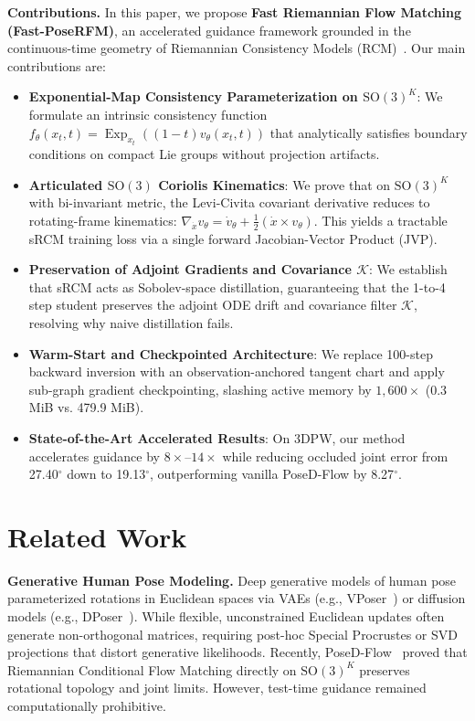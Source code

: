 \documentclass[10pt,twocolumn,letterpaper]{article}
\DeclareMathOperator{\Exp}{Exp}
\begin{document}
\textbf{Contributions.} In this paper, we propose \textbf{Fast Riemannian Flow Matching (Fast-PoseRFM)}, an accelerated guidance framework grounded in the continuous-time geometry of Riemannian Consistency Models (RCM)~\cite{zhou2025rcm}. Our main contributions are:
\begin{itemize}
    \item \textbf{Exponential-Map Consistency Parameterization on $\mathrm{SO}(3)^K$}: We formulate an intrinsic consistency function $f_\theta(x_t, t) = \Exp_{x_t}((1-t)v_\theta(x_t, t))$ that analytically satisfies boundary conditions on compact Lie groups without projection artifacts.
    \item \textbf{Articulated $\mathrm{SO}(3)$ Coriolis Kinematics}: We prove that on $\mathrm{SO}(3)^K$ with bi-invariant metric, the Levi-Civita covariant derivative reduces to rotating-frame kinematics: $\nabla_{\dot{x}} v_\theta = \dot{v}_\theta + \frac{1}{2}(\dot{x} \times v_\theta)$. This yields a tractable sRCM training loss via a single forward Jacobian-Vector Product (JVP).
    \item \textbf{Preservation of Adjoint Gradients and Covariance $\mathcal{K}$}: We establish that sRCM acts as Sobolev-space distillation, guaranteeing that the 1-to-4 step student preserves the adjoint ODE drift and covariance filter $\mathcal{K}$, resolving why naive distillation fails.
    \item \textbf{Warm-Start and Checkpointed Architecture}: We replace 100-step backward inversion with an observation-anchored tangent chart and apply sub-graph gradient checkpointing, slashing active memory by $1,600\times$ (0.3 MiB vs. 479.9 MiB).
    \item \textbf{State-of-the-Art Accelerated Results}: On 3DPW, our method accelerates guidance by $8\times$--$14\times$ while reducing occluded joint error from 27.40$^\circ$ down to 19.13$^\circ$, outperforming vanilla PoseD-Flow by 8.27$^\circ$.
\end{itemize}

\section{Related Work}

\textbf{Generative Human Pose Modeling.}
Deep generative models of human pose parameterized rotations in Euclidean spaces via VAEs (e.g., VPoser~\cite{pavlakos2019expressive}) or diffusion models (e.g., DPoser~\cite{choi2023dposer}). While flexible, unconstrained Euclidean updates often generate non-orthogonal matrices, requiring post-hoc Special Procrustes or SVD projections that distort generative likelihoods. Recently, PoseD-Flow~\cite{nadar2026posedflow} proved that Riemannian Conditional Flow Matching directly on $\mathrm{SO}(3)^K$ preserves rotational topology and joint limits. However, test-time guidance remained computationally prohibitive.
\end{document}
